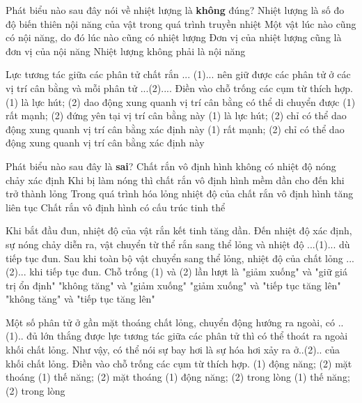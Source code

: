\begin{ex}
Phát biểu nào sau đây nói về nhiệt lượng là \textbf{không} đúng?
\choice
{Nhiệt lượng là số đo độ biến thiên nội năng của vật trong quá trình truyền nhiệt}
{\True Một vật lúc nào cũng có nội năng, do đó lúc nào cũng có nhiệt lượng}
{Đơn vị của nhiệt lượng cũng là đơn vị của nội năng}
{Nhiệt lượng không phải là nội năng}
\loigiai{}
\end{ex}

\begin{ex}
Lực tương tác giữa các phân tử chất rắn ... (1)... nên giữ được các phân tử ở các vị trí cân bằng và mỗi phân tử ...(2).... Điền vào chỗ trống các cụm từ thích hợp.
\choice
{(1) là lực hút; (2) dao động xung quanh vị trí cân bằng có thể di chuyển được}
{(1) rất mạnh; (2) đứng yên tại vị trí cân bằng này}
{(1) là lực hút; (2) chỉ có thể dao động xung quanh vị trí cân bằng xác định này}
{\True (1) rất mạnh; (2) chỉ có thể dao động xung quanh vị trí cân bằng xác định này}
\loigiai{}
\end{ex}

\begin{ex}
Phát biểu nào sau đây là \textbf{sai}?
\choice
{Chất rắn vô định hình không có nhiệt độ nóng chảy xác định}
{Khi bị làm nóng thì chất rắn vô định hình mềm dần cho đến khi trở thành lỏng}
{Trong quá trình hóa lỏng nhiệt độ của chất rắn vô định hình tăng liên tục}
{\True Chất rắn vô định hình có cấu trúc tinh thể}
\loigiai{}
\end{ex}

\begin{ex}
Khi bắt đầu đun, nhiệt độ của vật rắn kết tinh tăng dần. Đến nhiệt độ xác định, sự nóng chảy diễn ra, vật chuyển từ thể rắn sang thể lỏng và nhiệt độ ...(1)... dù tiếp tục đun. Sau khi toàn bộ vật chuyển sang thể lỏng, nhiệt độ của chất lỏng ...(2)... khi tiếp tục đun. Chỗ trống (1) và (2) lần lượt là
\choice
{"giảm xuống" và "giữ giá trị ổn định"}
{"không tăng" và "giảm xuống"}
{"giảm xuống" và "tiếp tục tăng lên"}
{\True "không tăng" và "tiếp tục tăng lên"}
\loigiai{}
\end{ex}

\begin{ex}
Một số phân tử ở gần mặt thoáng chất lỏng, chuyển động hướng ra ngoài, có ..(1).. đủ lớn thắng được lực tương tác giữa các phân tử thì có thể thoát ra ngoài khối chất lỏng. Như vậy, có thể nói sự bay hơi là sự hóa hơi xảy ra ở..(2).. của khối chất lỏng. Điền vào chỗ trống các cụm từ thích hợp.
\choice
{\True (1) động năng; (2) mặt thoáng}
{(1) thế năng; (2) mặt thoáng}
{(1) động năng; (2) trong lòng}
{(1) thế năng; (2) trong lòng}
\loigiai{}
\end{ex}

